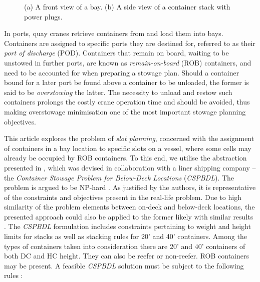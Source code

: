 \documentclass[preprint,11pt,3p]{elsarticle}
\begin{document}
\begin{figure}[ht]
\begin{subfigure}[b]{0.28\textwidth}
        \caption{}
        \label{fig:stack}
    \end{subfigure}
    \caption{(a) A front view of a bay. (b) A side view of a container stack with power plugs.}\label{fig:bay_stack}
\end{figure}

In ports, quay cranes retrieve containers from and load them into bays. Containers are assigned to specific ports they are destined for, referred to as their \textit{port of discharge} (POD). Containers that remain on board, waiting to be unstowed in further ports, are known as \textit{remain-on-board} (ROB) containers, and need to be accounted for when preparing a stowage plan. Should a container bound for a later port be found above a container to be unloaded, the former is said to be \textit{overstowing} the latter. The necessity to unload and restow such containers prolongs the costly crane operation time and should be avoided, thus making overstowage minimisation one of the most important stowage planning objectives.

This article explores the problem of \textit{slot planning}, concerned with the assignment of containers in a bay location to specific slots on a vessel, where some cells may already be occupied by ROB containers. To this end, we utilise the abstraction presented in \cite{DJJRA12}, which was devised in collaboration with a liner shipping company -- the \textit{Container Stowage Problem for Below-Deck Locations} (\textit{CSPBDL}). The problem is argued to be NP-hard \cite{DJJRA12}. As justified by the authors, it is representative of the constraints and objectives present in the real-life problem. Due to high similarity of the problem elements between on-deck and below-deck locations, the presented approach could also be applied to the former likely with similar results \cite{DJJRA12}. The \textit{CSPBDL} formulation includes constraints pertaining to weight and height limits for stacks as well as stacking rules for 20' and 40' containers. Among the types of containers taken into consideration there are 20' and 40' containers of both DC and HC height. They can also be reefer or non-reefer. ROB containers may be present. A feasible \textit{CSPBDL} solution must be subject to the following rules \cite{DJJRA12}:
\end{document}
